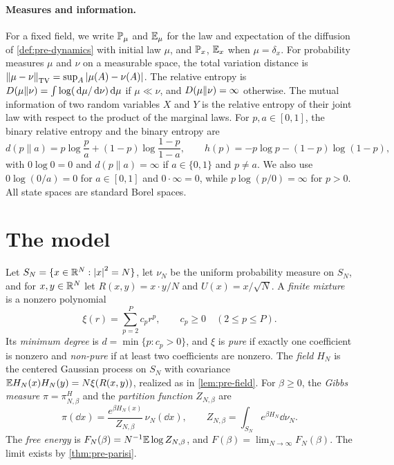\paragraph{Measures and information.} For a fixed field, we write $\mathbb P_\mu$ and $\mathbb E_\mu$ for the law and expectation of the diffusion of \cref{def:pre-dynamics} with initial law $\mu$, and $\mathbb P_x$, $\mathbb E_x$ when $\mu=\delta_x$. For probability measures $\mu$ and $\nu$ on a measurable space, the total variation distance is $\left\lVert\mu-\nu\right\rVert_{\mathrm{TV}}=\sup_A\left|\mu(A)-\nu(A)\right|$. The relative entropy is $D(\mu\|\nu)=\int\log(\,\mathrm d\mu/\,\mathrm d\nu)\,\mathrm d\mu$ if $\mu\ll\nu$, and $D(\mu\|\nu)=\infty$ otherwise. The mutual information of two random variables $X$ and $Y$ is the relative entropy of their joint law with respect to the product of the marginal laws. For $p,a\in[0,1]$, the binary relative entropy and the binary entropy are
\[
d(p\|a)=p\log\frac pa+(1-p)\log\frac{1-p}{1-a},\qquad h(p)=-p\log p-(1-p)\log(1-p),
\]
with $0\log0=0$ and $d(p\|a)=\infty$ if $a\in\{0,1\}$ and $p\ne a$. We also use $0\log(0/a)=0$ for $a\in[0,1]$ and $0\cdot\infty=0$, while $p\log(p/0)=\infty$ for $p>0$. All state spaces are standard Borel spaces.

\section{The model}\label{sec:pre-model}

\begin{definition}[Model]\label{def:pre-model}
Let $S_N=\{x\in\mathbb R^N:\left|x\right|^2=N\}$, let $\nu_N$ be the uniform probability measure on $S_N$, and for $x,y\in\mathbb R^N$ let $R(x,y)=x\cdot y/N$ and $U(x)=x/\sqrt N$. A \emph{finite mixture} is a nonzero polynomial
\[
\xi(r)=\sum_{p=2}^Pc_pr^p,\qquad c_p\ge0\quad(2\le p\le P).
\]
Its \emph{minimum degree} is $d=\min\{p:c_p>0\}$, and $\xi$ is \emph{pure} if exactly one coefficient is nonzero and \emph{non-pure} if at least two coefficients are nonzero. The \emph{field} $H_N$ is the centered Gaussian process on $S_N$ with covariance $\mathbb E H_N(x)H_N(y)=N\xi(R(x,y))$, realized as in \cref{lem:pre-field}. For $\beta\ge0$, the \emph{Gibbs measure} $\pi=\pi^H_{N,\beta}$ and the \emph{partition function} $Z_{N,\beta}$ are
\[
\pi(\dd x)=\frac{e^{\beta H_N(x)}}{Z_{N,\beta}}\,\nu_N(\dd x),\qquad Z_{N,\beta}=\int_{S_N}e^{\beta H_N}\dd\nu_N.
\]
The \emph{free energy} is $F_N(\beta)=N^{-1}\mathbb E\log Z_{N,\beta}$, and $F(\beta)=\lim_{N\to\infty}F_N(\beta)$. The limit exists by \cref{thm:pre-parisi}.
\end{definition}

